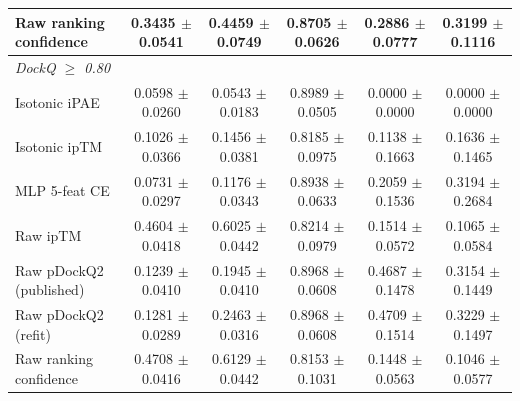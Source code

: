 \begin{table}[t]
\begin{tabular}{lccccc}
Raw ranking confidence & 0.3435 $\pm$ 0.0541 & 0.4459 $\pm$ 0.0749 & 0.8705 $\pm$ 0.0626 & 0.2886 $\pm$ 0.0777 & 0.3199 $\pm$ 0.1116 \\
\midrule
\multicolumn{6}{l}{\textit{DockQ $\geq$ 0.80}} \\
Isotonic iPAE & 0.0598 $\pm$ 0.0260 & 0.0543 $\pm$ 0.0183 & 0.8989 $\pm$ 0.0505 & 0.0000 $\pm$ 0.0000 & 0.0000 $\pm$ 0.0000 \\
Isotonic ipTM & 0.1026 $\pm$ 0.0366 & 0.1456 $\pm$ 0.0381 & 0.8185 $\pm$ 0.0975 & 0.1138 $\pm$ 0.1663 & 0.1636 $\pm$ 0.1465 \\
MLP 5-feat CE & 0.0731 $\pm$ 0.0297 & 0.1176 $\pm$ 0.0343 & 0.8938 $\pm$ 0.0633 & 0.2059 $\pm$ 0.1536 & 0.3194 $\pm$ 0.2684 \\
Raw ipTM & 0.4604 $\pm$ 0.0418 & 0.6025 $\pm$ 0.0442 & 0.8214 $\pm$ 0.0979 & 0.1514 $\pm$ 0.0572 & 0.1065 $\pm$ 0.0584 \\
Raw pDockQ2 (published) & 0.1239 $\pm$ 0.0410 & 0.1945 $\pm$ 0.0410 & 0.8968 $\pm$ 0.0608 & 0.4687 $\pm$ 0.1478 & 0.3154 $\pm$ 0.1449 \\
Raw pDockQ2 (refit) & 0.1281 $\pm$ 0.0289 & 0.2463 $\pm$ 0.0316 & 0.8968 $\pm$ 0.0608 & 0.4709 $\pm$ 0.1514 & 0.3229 $\pm$ 0.1497 \\
Raw ranking confidence & 0.4708 $\pm$ 0.0416 & 0.6129 $\pm$ 0.0442 & 0.8153 $\pm$ 0.1031 & 0.1448 $\pm$ 0.0563 & 0.1046 $\pm$ 0.0577 \\
\bottomrule
\end{tabular}
\end{table}
